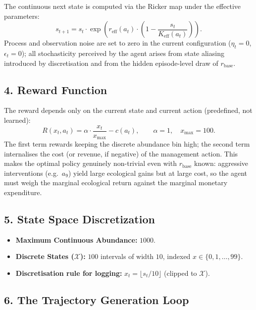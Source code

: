 \documentclass[11pt]{article}
\begin{document}
The continuous next state is computed via the Ricker map under the effective parameters:
\[
    s_{t+1} = s_t \cdot \exp\!\left( r_{\mathrm{eff}}(a_t) \cdot \left(1 - \frac{s_t}{K_{\mathrm{eff}}(a_t)} \right) \right).
\]
Process and observation noise are set to zero in the current configuration ($\eta_t = 0$, $\epsilon_t = 0$); all stochasticity perceived by the agent arises from state aliasing introduced by discretisation and from the hidden episode-level draw of $r_{\mathrm{base}}$.

\subsection*{4. Reward Function}

The reward depends only on the current state and current action (predefined, not learned):
\[
    R(x_t, a_t) = \alpha \cdot \frac{x_t}{x_{\max}} - c(a_t), \qquad \alpha = 1, \quad x_{\max} = 100.
\]
The first term rewards keeping the discrete abundance bin high; the second term internalises the cost (or revenue, if negative) of the management action. This makes the optimal policy genuinely non-trivial even with $r_{\mathrm{base}}$ known: aggressive interventions (e.g.\ $a_9$) yield large ecological gains but at large cost, so the agent must weigh the marginal ecological return against the marginal monetary expenditure.

\subsection*{5. State Space Discretization}
\begin{itemize}
    \item \textbf{Maximum Continuous Abundance:} $1000$.
    \item \textbf{Discrete States ($\mathcal{X}$):} $100$ intervals of width $10$, indexed $x \in \{0, 1, \dots, 99\}$.
    \item \textbf{Discretisation rule for logging:} $x_t = \lfloor s_t / 10 \rfloor$ (clipped to $\mathcal{X}$).
\end{itemize}

\subsection*{6. The Trajectory Generation Loop}
\end{document}
